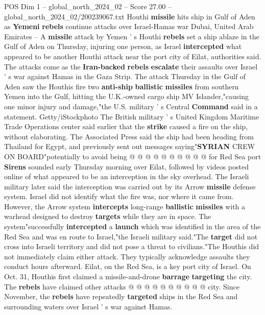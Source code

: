 \begin{textsample}{POS Dim 1 – global\_north\_2024\_02 – Score 27.00 – global\_north\_2024\_02/200239067.txt}  \label{ex:f1_pos_272}
Houthi \textbf{missile} hits ship in Gulf of Aden as \textbf{Yemeni} \textbf{rebels} continue attacks over Israel-Hamas war Dubai, United Arab Emirates -- A \textbf{missile} attack by Yemen ' s Houthi \textbf{rebels} set a ship ablaze in the Gulf of Aden on Thursday, injuring one person, as Israel \textbf{intercepted} what appeared to be another Houthi attack near the port city of Eilat, authorities said.
The attacks come as the \textbf{Iran-backed} \textbf{rebels} \textbf{escalate} their assaults over Israel ' s war against Hamas in the Gaza Strip.
The attack Thursday in the Gulf of Aden saw the Houthis fire two \textbf{anti-ship} \textbf{ballistic} \textbf{missiles} from southern Yemen into the Gulf, hitting the U.K.-owned cargo ship MV Islander,"causing one minor injury and damage,"the U.S. military ' s Central \textbf{Command} said in a statement.
Getty/iStockphoto The British military ' s United Kingdom Maritime Trade Operations center said earlier that the \textbf{strike} caused a fire on the ship, without elaborating.
The Associated Press said the ship had been heading from Thailand for Egypt, and previously sent out messages saying"\textbf{SYRIAN} CREW ON BOARD"potentially to avoid being @ @ @ @ @ @ @ @ @ @ for Red Sea port \textbf{Sirens} sounded early Thursday morning over Eilat, followed by videos posted online of what appeared to be an interception in the sky overhead.
The Israeli military later said the interception was carried out by its Arrow \textbf{missile} defense system.
Israel did not identify what the fire was, nor where it came from.
However, the Arrow system \textbf{intercepts} long-range \textbf{ballistic} \textbf{missiles} with a warhead designed to destroy \textbf{targets} while they are in space.
The system"successfully \textbf{intercepted} a \textbf{launch} which was identified in the area of the Red Sea and was en route to Israel,"the Israeli military said."The \textbf{target} did not cross into Israeli territory and did not pose a threat to civilians."The Houthis did not immediately claim either attack.
They typically acknowledge assaults they conduct hours afterward.
Eilat, on the Red Sea, is a key port city of Israel.
On Oct. 31, Houthis first claimed a missile-and-drone \textbf{barrage} \textbf{targeting} the city.
The \textbf{rebels} have claimed other attacks @ @ @ @ @ @ @ @ @ @ city.
Since November, the \textbf{rebels} have repeatedly \textbf{targeted} ships in the Red Sea and surrounding waters over Israel ' s war against Hamas.

\end{textsample}
